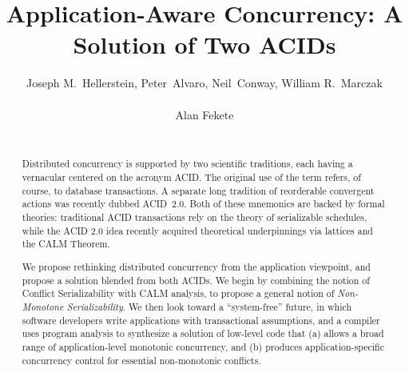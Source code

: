 \documentclass{sig-alternate}
\begin{document}

\title{Application-Aware Concurrency: A Solution of Two ACIDs}
\author{
\alignauthor
Joseph M.~Hellerstein, Peter~Alvaro, Neil~Conway, William R.~Marczak\\
       \\
\alignauthor
Alan Fekete\\
       \\
}

\maketitle
\begin{abstract}
  Distributed concurrency is supported by two scientific traditions, each having
  a vernacular centered on the acronym \textsf{ACID}.  The original use of the
  term refers, of course, to database transactions. A separate long tradition of
  reorderable convergent actions was recently dubbed \textsf{ACID~2.0}.  Both of
  these mnemonics are backed by formal theories: traditional ACID transactions
  rely on the theory of serializable schedules, while the ACID 2.0 idea recently
  acquired theoretical underpinnings via lattices and the CALM Theorem.

  We propose rethinking distributed concurrency from the application viewpoint,
  and propose a solution blended from both ACIDs.  We begin by combining the
  notion of Conflict Serializability with CALM analysis, to propose a general
  notion of \emph{Non-Monotone Serializability}.  We then look toward a
  ``system-free'' future, in which software developers write applications with
  transactional assumptions, and a compiler uses program analysis to synthesize
  a solution of low-level code that (a) allows a broad range of
  application-level monotonic concurrency, and (b) produces application-specific
  concurrency control for essential non-monotonic conflicts.
\end{abstract}
\end{document}
